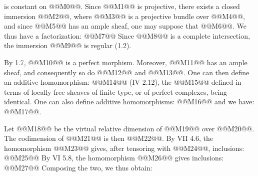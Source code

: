 is constant on @@M0@@. Since @@M1@@ is projective, there exists a closed immersion @@M2@@, where @@M3@@ is a projective bundle over @@M4@@, and since @@M5@@ has an ample sheaf, one may suppose that @@M6@@. We thus have a factorization:
@@M7@@
Since @@M8@@ is a complete intersection, the immersion @@M9@@ is regular (1.2).

By 1.7, @@M10@@ is a perfect morphism. Moreover, @@M11@@ has an ample sheaf, and consequently so do @@M12@@ and @@M13@@. One can then define an additive homomorphism:
@@M14@@
(IV 2.12), the @@M15@@ defined in terms of locally free sheaves of finite type, or of perfect complexes, being identical. One can also define additive homomorphisms:
@@M16@@
and we have: @@M17@@.

Let @@M18@@ be the virtual relative dimension of @@M19@@ over @@M20@@. The codimension of @@M21@@ is then @@M22@@. By VII 4.6, the homomorphism @@M23@@ gives, after tensoring with @@M24@@, inclusions:
@@M25@@
By VI 5.8, the homomorphism @@M26@@ gives inclusions:
@@M27@@
Composing the two, we thus obtain:
